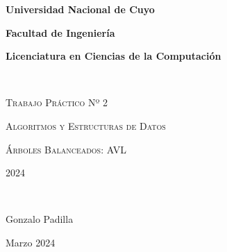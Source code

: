{\centering
    {\bfseries\Large Universidad Nacional de Cuyo \par}
    \vspace{-0.2cm}
    {\bfseries\Large Facultad de Ingeniería \par}
    \vspace{-0.2cm}
    {\bfseries\Large Licenciatura en Ciencias de la Computación \par}
    \pagestyle{plain}
    \vfill
    \noindent\hrulefill \\
    {\scshape\Huge Trabajo Práctico Nº 2\par} %
    \vspace{0.5cm}
    {\scshape\Large Algoritmos y Estructuras de Datos \par}
    {\scshape\large Árboles Balanceados: AVL \par}
    \vspace{0.5cm}
    {\scshape\Large 2024 \par} %
    \noindent\hrulefill \\
    \vspace{4cm}
    {\Large Gonzalo Padilla \par}
    {\large Marzo 2024 \par} %
    \vfill
    \setcounter{page}{1}
    \newpage
}